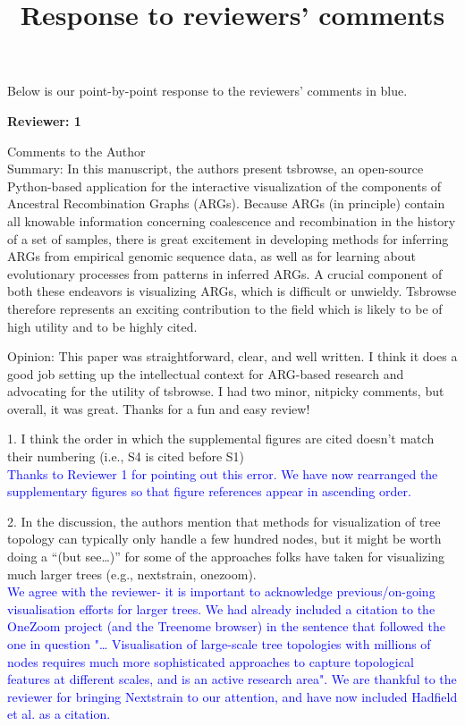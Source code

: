\documentclass{article}
\title{Response to reviewers' comments}
\begin{document}
\maketitle

Below is our point-by-point response to the reviewers' comments in blue. 


\textbf{Reviewer: 1}


Comments to the Author \\

Summary: In this manuscript, the authors present tsbrowse, an open-source Python-based 
application for the interactive visualization of the components of Ancestral Recombination 
Graphs (ARGs). Because ARGs (in principle) contain all knowable information concerning 
coalescence and recombination in the history of a set of samples, there is great excitement 
in developing methods for inferring ARGs from empirical genomic sequence data, as well as 
for learning about evolutionary processes from patterns in inferred ARGs. A crucial component 
of both these endeavors is visualizing ARGs, which is difficult or unwieldy. Tsbrowse therefore 
represents an exciting contribution to the field which is likely to be of high utility and 
to be highly cited.

Opinion: This paper was straightforward, clear, and well written. I think it does a good job 
setting up the intellectual context for ARG-based research and advocating for the utility of 
tsbrowse. I had two minor, nitpicky comments, but overall, it was great.  Thanks for a fun and 
easy review!

1. I think the order in which the supplemental figures are cited doesn’t match their numbering 
(i.e., S4 is cited before S1)\\
\textcolor{blue}{Thanks to Reviewer 1 for pointing out this error. We have now rearranged the 
supplementary figures so that figure references appear in ascending order.}

2. In the discussion, the authors mention that methods for visualization of tree topology can 
typically only handle a few hundred nodes, but it might be worth doing a ``(but see…)'' for some 
of the approaches folks have taken for visualizing much larger trees (e.g., nextstrain, onezoom).\\
\textcolor{blue}{We agree with the reviewer-  it is important to acknowledge previous/on-going visualisation efforts 
for larger trees. We had already included a citation to the OneZoom project (and the Treenome browser) in the 
sentence that followed the one in question "… Visualisation of large-scale tree topologies with millions of nodes 
requires much more sophisticated approaches to capture topological features at different scales, 
and is an active research area". We are thankful to the reviewer for bringing Nextstrain to our 
attention, and have now included Hadfield et al. as a citation.}
\end{document}
